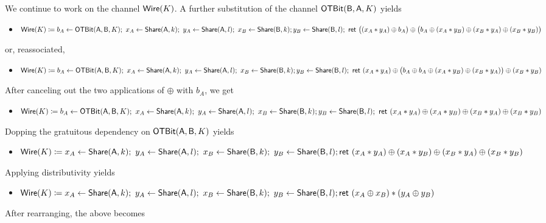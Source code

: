 \begin{itemize}
We continue to work on the channel $\mathsf{Wire}(K)$. A further substitution of the channel $\mathsf{OTBit}(\mathsf{B},\mathsf{A},K)$ yields
\begin{itemize}
\item $\mathsf{Wire}(K) \coloneqq b_A \leftarrow \mathsf{OTBit}(\mathsf{A},\mathsf{B},K); \ x_A \leftarrow \mathsf{Share}(\mathsf{A},k); \ y_A \leftarrow \mathsf{Share}(\mathsf{A},l); \ x_B \leftarrow \mathsf{Share}(\mathsf{B},k); \\ y_B \leftarrow \mathsf{Share}(\mathsf{B},l); \ \mathsf{ret} \ \big((x_A * y_A) \oplus b_A\big) \oplus \big(b_A \oplus (x_A * y_B) \oplus (x_B * y_A) \oplus (x_B * y_B)\big)$
\end{itemize}
or, reassociated,
\begin{itemize}
\item $\mathsf{Wire}(K) \coloneqq b_A \leftarrow \mathsf{OTBit}(\mathsf{A},\mathsf{B},K); \ x_A \leftarrow \mathsf{Share}(\mathsf{A},k); \ y_A \leftarrow \mathsf{Share}(\mathsf{A},l); \ x_B \leftarrow \mathsf{Share}(\mathsf{B},k); \\ y_B \leftarrow \mathsf{Share}(\mathsf{B},l); \ \mathsf{ret} \ (x_A * y_A) \oplus \big(b_A \oplus b_A \oplus (x_A * y_B) \oplus (x_B * y_A)\big) \oplus (x_B * y_B)$
\end{itemize}
After canceling out the two applications of $\oplus$ with $b_A$, we get
\begin{itemize}
\item $\mathsf{Wire}(K) \coloneqq b_A \leftarrow \mathsf{OTBit}(\mathsf{A},\mathsf{B},K); \ x_A \leftarrow \mathsf{Share}(\mathsf{A},k); \ y_A \leftarrow \mathsf{Share}(\mathsf{A},l); \ x_B \leftarrow \mathsf{Share}(\mathsf{B},k); \\ y_B \leftarrow \mathsf{Share}(\mathsf{B},l); \ \mathsf{ret} \ (x_A * y_A) \oplus (x_A * y_B) \oplus (x_B * y_A) \oplus (x_B * y_B)$
\end{itemize}
Dopping the gratuitous dependency on $\mathsf{OTBit}(\mathsf{A},\mathsf{B},K)$ yields
\begin{itemize}
\item $\mathsf{Wire}(K) \coloneqq x_A \leftarrow \mathsf{Share}(\mathsf{A},k); \ y_A \leftarrow \mathsf{Share}(\mathsf{A},l); \ x_B \leftarrow \mathsf{Share}(\mathsf{B},k); \ y_B \leftarrow \mathsf{Share}(\mathsf{B},l); \\ \mathsf{ret} \ (x_A * y_A) \oplus (x_A * y_B) \oplus (x_B * y_A) \oplus (x_B * y_B)$
\end{itemize}
Applying distributivity yields
\begin{itemize}
\item $\mathsf{Wire}(K) \coloneqq x_A \leftarrow \mathsf{Share}(\mathsf{A},k); \ y_A \leftarrow \mathsf{Share}(\mathsf{A},l); \ x_B \leftarrow \mathsf{Share}(\mathsf{B},k); \ y_B \leftarrow \mathsf{Share}(\mathsf{B},l); \\ \mathsf{ret} \ (x_A \oplus x_B) * (y_A \oplus y_B)$
\end{itemize}
After rearranging, the above becomes
\begin{itemize}

\end{itemize}
\end{itemize}
